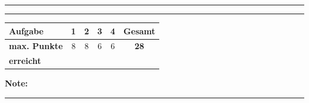 \documentclass[11pt, a4paper]{article}
\newcommand{\luecke}[1]{\rule{#1}{0.4pt}}
\begin{document}
\luecke{10cm}


\vspace{25pt}
\hrule
\vspace{10pt}

\noindent
\begin{tabularx}{\textwidth}{|X|c|c|c|c||c|}
\hline
\textbf{Aufgabe} & 1 & 2 & 3 & 4 & \textbf{Gesamt} \\
\hline
\textbf{max. Punkte} & 8 & 8 & 6 & 6 & \textbf{28} \\
\hline
\textbf{erreicht} & & & & & \\[0.8em]
\hline
\end{tabularx}

\vspace{10pt}

\begin{flushright}
\textbf{Note:} \luecke{2cm}
\end{flushright}
\end{document}
